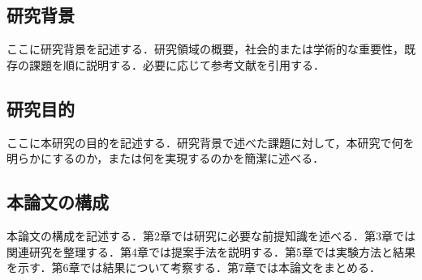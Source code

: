 \subsection{研究背景}
ここに研究背景を記述する．研究領域の概要，社会的または学術的な重要性，既存の課題を順に説明する．必要に応じて参考文献を引用する\cite{example2026}．

\subsection{研究目的}
ここに本研究の目的を記述する．研究背景で述べた課題に対して，本研究で何を明らかにするのか，または何を実現するのかを簡潔に述べる．

\subsection{本論文の構成}
本論文の構成を記述する．第2章では研究に必要な前提知識を述べる．第3章では関連研究を整理する．第4章では提案手法を説明する．第5章では実験方法と結果を示す．第6章では結果について考察する．第7章では本論文をまとめる．
